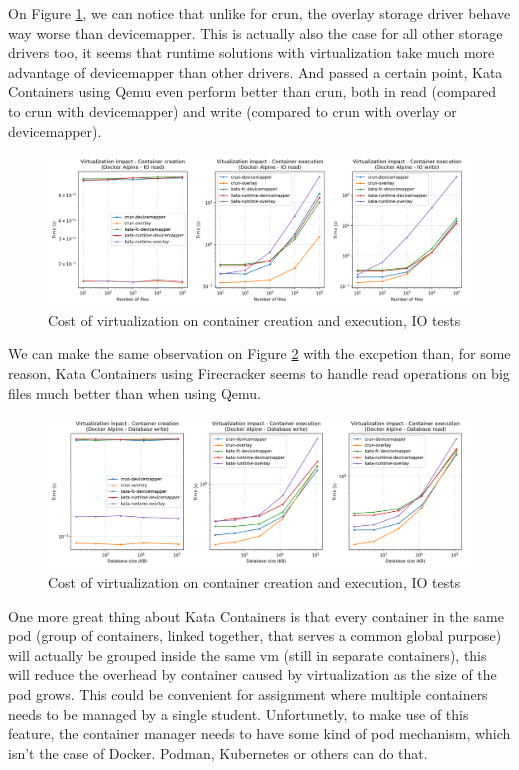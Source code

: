 On Figure \ref{fig:q3:virtualization:io}, we can notice that unlike for crun, the overlay storage driver behave way worse than devicemapper.  This is actually also the case for all other storage drivers too, it seems that runtime solutions with virtualization take much more advantage of devicemapper than other drivers.  And passed a certain point, Kata Containers using Qemu even perform better than crun, both in read (compared to crun with devicemapper) and write (compared to crun with overlay or devicemapper).

\begin{figure}[h!]
  \begin{center}
    \includegraphics[width=\linewidth]{images/question-3-virtualization-io.png}
    \caption{Cost of virtualization on container creation and execution, IO tests}
    \label{fig:q3:virtualization:io}
  \end{center}
\end{figure}

We can make the same observation on Figure \ref{fig:q3:virtualization:db} with the excpetion than, for some reason, Kata Containers using Firecracker seems to handle read operations on big files much better than when using Qemu.

\begin{figure}[h!]
  \begin{center}
    \includegraphics[width=\linewidth]{images/question-3-virtualization-db.png}
    \caption{Cost of virtualization on container creation and execution, IO tests}
    \label{fig:q3:virtualization:db}
  \end{center}
\end{figure}

One more great thing about Kata Containers is that every container in the same pod (group of containers, linked together, that serves a common global purpose) will actually be grouped inside the same vm (still in separate containers), this will reduce the overhead by container caused by virtualization as the size of the pod grows.  This could be convenient for assignment where multiple containers needs to be managed by a single student.  Unfortunetly, to make use of this feature, the container manager needs to have some kind of pod mechanism, which isn't the case of Docker.  Podman, Kubernetes or others can do that.
